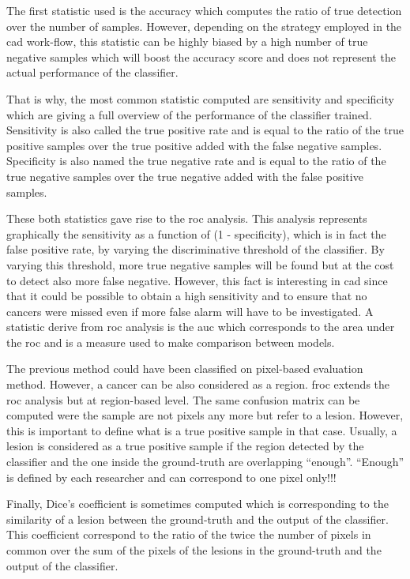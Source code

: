 The first statistic used is the accuracy which computes the ratio of true detection over the number of samples. However, depending on the strategy employed in the \ac{cad} work-flow, this statistic can be highly biased by a high number of true negative samples which will boost the accuracy score and does not represent the actual performance of the classifier.

That is why, the most common statistic computed are sensitivity and specificity which are giving a full overview of the performance of the classifier trained. Sensitivity is also called the true positive rate and is equal to the ratio of the true positive samples over the true positive added with the false negative samples. Specificity is also named the true negative rate and is equal to the ratio of the true negative samples over the true negative added with the false positive samples.

These both statistics gave rise to the \acf{roc} analysis. This analysis represents graphically the sensitivity as a function of (1 - specificity), which is in fact the false positive rate, by varying the discriminative threshold of the classifier. By varying this threshold, more true negative samples will be found but at the cost to detect also more false negative. However, this fact is interesting in \ac{cad} since that it could be possible to obtain a high sensitivity and to ensure that no cancers were missed even if more false alarm will have to be investigated. A statistic derive from \ac{roc} analysis is the \acf{auc} which corresponds to the area under the \ac{roc} and is a measure used to make comparison between models.

The previous method could have been classified on pixel-based evaluation method. However, a cancer can be also considered as a region. \Acf{froc} extends the \ac{roc} analysis but at region-based level. The same confusion matrix can be computed were the sample are not pixels any more but refer to a lesion. However, this is important to define what is a true positive sample in that case. Usually, a lesion is considered as a true positive sample if the region detected by the classifier and the one inside the ground-truth are overlapping ``enough''. ``Enough'' is defined by each researcher and can correspond to one pixel only!!!

Finally, Dice's coefficient is sometimes computed which is corresponding to the similarity of a lesion between the ground-truth and the output of the classifier. This coefficient correspond to the ratio of the twice the number of pixels in common over the sum of the pixels of the lesions in the ground-truth and the output of the classifier.